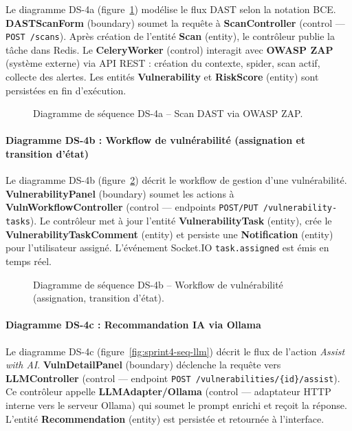 Le diagramme DS-4a (figure~\ref{fig:sprint4-seq-dast}) modélise le flux DAST selon la notation BCE. \textbf{DASTScanForm} (boundary) soumet la requête à \textbf{ScanController} (control — \texttt{POST /scans}). Après création de l'entité \textbf{Scan} (entity), le contrôleur publie la tâche dans Redis. Le \textbf{CeleryWorker} (control) interagit avec \textbf{OWASP ZAP} (système externe) via API REST : création du contexte, spider, scan actif, collecte des alertes. Les entités \textbf{Vulnerability} et \textbf{RiskScore} (entity) sont persistées en fin d'exécution.

\begin{figure}[H]
\centering
\fbox{\rule{0pt}{2in}\rule{0.9\linewidth}{0pt}}
\caption{Diagramme de séquence DS-4a -- Scan DAST via OWASP ZAP.}
\label{fig:sprint4-seq-dast}
\end{figure}

\paragraph{Diagramme DS-4b : Workflow de vulnérabilité (assignation et transition d'état)}

Le diagramme DS-4b (figure~\ref{fig:sprint4-seq-workflow}) décrit le workflow de gestion d'une vulnérabilité. \textbf{VulnerabilityPanel} (boundary) soumet les actions à \textbf{VulnWorkflowController} (control — endpoints \texttt{POST/PUT /vulnerability-tasks}). Le contrôleur met à jour l'entité \textbf{VulnerabilityTask} (entity), crée le \textbf{VulnerabilityTaskComment} (entity) et persiste une \textbf{Notification} (entity) pour l'utilisateur assigné. L'événement Socket.IO \texttt{task.assigned} est émis en temps réel.

\begin{figure}[H]
\centering
\fbox{\rule{0pt}{2in}\rule{0.9\linewidth}{0pt}}
\caption{Diagramme de séquence DS-4b -- Workflow de vulnérabilité (assignation, transition d'état).}
\label{fig:sprint4-seq-workflow}
\end{figure}

\paragraph{Diagramme DS-4c : Recommandation IA via Ollama}

Le diagramme DS-4c (figure~\ref{fig:sprint4-seq-llm}) décrit le flux de l'action \textit{Assist with AI}. \textbf{VulnDetailPanel} (boundary) déclenche la requête vers \textbf{LLMController} (control — endpoint \texttt{POST /vulnerabilities/\{id\}/assist}). Ce contrôleur appelle \textbf{LLMAdapter/Ollama} (control — adaptateur HTTP interne vers le serveur Ollama) qui soumet le prompt enrichi et reçoit la réponse. L'entité \textbf{Recommendation} (entity) est persistée et retournée à l'interface.

